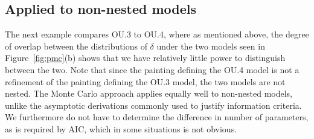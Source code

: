 \subsection{Applied to non-nested models}
The next example compares OU.3 to OU.4, where as mentioned above,
the degree of overlap between the distributions of $\delta$ under the two models seen in Figure~\ref{fig:pmc}(b)
shows that we have relatively little power to distinguish between the two.
Note that
since the painting defining the OU.4 model is not a refinement of the painting defining the OU.3 model,
the two models are not nested.
The Monte Carlo approach applies equally well to non-nested models,
unlike the asymptotic derivations commonly used to justify information criteria.
We furthermore do not have to determine the difference in number of parameters, 
as is required by AIC, which in some situations is not obvious.


